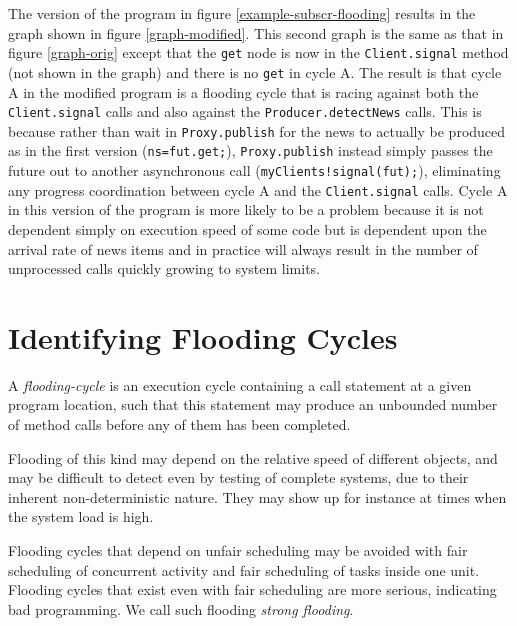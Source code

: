 \documentclass[12pt]{article}%
\begin{document}
The version of the program in figure \ref{example-subscr-flooding}
results in the graph shown in figure \ref{graph-modified}. This second graph is the same as that in figure \ref{graph-orig}
except that the \lstinline{get} node is now in the  \lstinline{Client.signal}
method (not shown in the graph) and there is no \lstinline{get} in cycle A. 
The result is that cycle A in the modified program
is a flooding cycle that is racing against both the
\lstinline{Client.signal} calls and also against the
\lstinline{Producer.detectNews} calls.  This is because rather than
wait in \lstinline{Proxy.publish} for the news to actually be produced
as in the first version (\lstinline{ns=fut.get;}),
\lstinline{Proxy.publish} instead simply passes the future out to
another asynchronous call (\lstinline{myClients!signal(fut);}),
eliminating any progress coordination between cycle A and the
\lstinline{Client.signal} calls. Cycle A in this version of the program is more likely to be a
problem because it is not dependent simply on execution speed of some
code but is dependent upon the arrival rate of news items and in
practice will always result in the number of unprocessed calls quickly
growing to system limits.

\section{Identifying Flooding Cycles}

\begin{definition}
\label{flooding-cycle}
A \emph{flooding-cycle} is an execution cycle 
containing a call statement
 at a given program location, such that 
this statement may produce an unbounded number of  method calls  
before any of them %
 has been completed.
\end{definition}%

Flooding of this kind may depend on the relative
speed of different objects, and  may be difficult to detect even
by testing of complete systems, due to their inherent
non-deterministic nature.  They may show up for instance at times when
the system load is high.

Flooding cycles that depend on unfair scheduling
may be avoided with fair scheduling of concurrent activity and
fair scheduling of  tasks inside one unit.
Flooding cycles that exist even with fair scheduling
are more serious, indicating bad programming.
We call such flooding \emph{strong flooding}.
\end{document}
